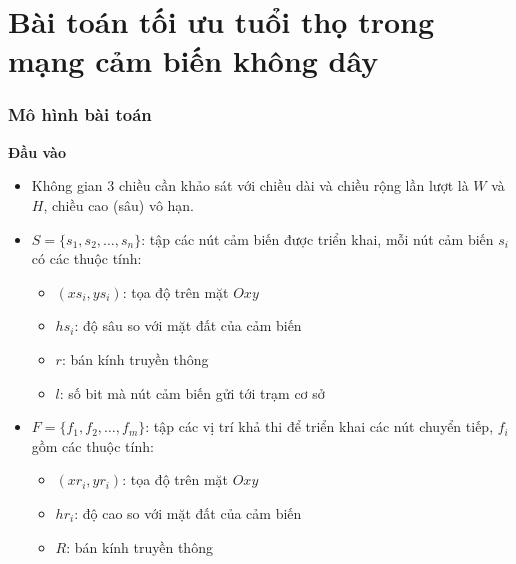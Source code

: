 \section{Bài toán tối ưu tuổi thọ trong mạng cảm biến không dây}

\begin{frame}
    \frametitle{Mô hình bài toán}
    \textbf{Đầu vào }
\begin{itemize}
    \item Không gian 3 chiều cần khảo sát với chiều dài và chiều rộng lần lượt là $W$ và $H$, chiều cao (sâu) vô hạn.
    \item $S = \{s_1, s_2,…, s_n\}$: tập các nút cảm biến được triển khai, mỗi nút cảm biến $s_i$ có các thuộc tính:
    \begin{itemize}
        \item[] $(xs_i, ys_i)$: tọa độ trên mặt $Oxy$
        \item[] $hs_i$: độ sâu so với mặt đất của cảm biến
        \item[] $r$: bán kính truyền thông 
        \item[] $l$: số bit mà nút cảm biến gửi tới trạm cơ sở
    \end{itemize}
    \item $F = \{f_1, f_2,…, f_m\}$: tập các vị trí khả thi để triển khai các nút chuyển tiếp, $f_i$ gồm các thuộc tính:
    \begin{itemize}
        \item[] $(xr_i, yr_i)$: tọa độ trên mặt $Oxy$
        \item[] $hr_i$: độ cao so với mặt đất của cảm biến
        \item[] $R$: bán kính truyền thông 
    \end{itemize}
\end{itemize}
\end{frame}

